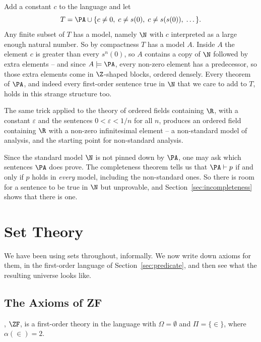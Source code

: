 \begin{example}
  Add a constant $c$ to the language and let
  $$T = \PA \cup \{c \neq 0, \; c \neq s(0), \; c \neq s(s(0)), \; \dots\}.$$
  Any finite subset of $T$ has a model, namely $\N$ with $c$ interpreted as a large enough natural number. So by compactness $T$ has a model $A$. Inside $A$ the element $c$ is greater than every $s^n(0)$, so $A$ contains a copy of $\N$ followed by extra elements -- and since $A \models \PA$, every non-zero element has a predecessor, so those extra elements come in $\Z$-shaped blocks, ordered densely. Every theorem of $\PA$, and indeed every first-order sentence true in $\N$ that we care to add to $T$, holds in this strange structure too.
\end{example}

The same trick applied to the theory of ordered fields containing $\R$, with a constant $\varepsilon$ and the sentences $0 < \varepsilon < 1/n$ for all $n$, produces an ordered field containing $\R$ with a non-zero infinitesimal element -- a non-standard model of analysis, and the starting point for non-standard analysis.

Since the standard model $\N$ is not pinned down by $\PA$, one may ask which sentences $\PA$ does prove. The completeness theorem tells us that $\PA \vdash p$ if and only if $p$ holds in \emph{every} model, including the non-standard ones. So there is room for a sentence to be true in $\N$ but unprovable, and Section~\ref{sec:incompleteness} shows that there is one.

\section{Set Theory}\label{sec:settheory}

We have been using sets throughout, informally. We now write down axioms for them, in the first-order language of Section~\ref{sec:predicate}, and then see what the resulting universe looks like.

\subsection{The Axioms of ZF}

\begin{definition}
  , $\ZF$, is a first-order theory in the language with $\Omega = \emptyset$ and $\Pi = \{\in\}$, where $\alpha(\in) = 2$.
\end{definition}

